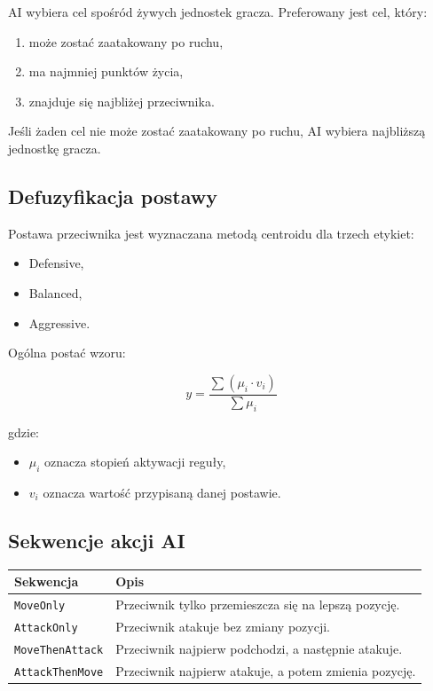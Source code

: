 \documentclass[12pt,a4paper]{article}
\begin{document}
AI wybiera cel spośród żywych jednostek gracza. Preferowany jest cel, który:

\begin{enumerate}
    \item może zostać zaatakowany po ruchu,
    \item ma najmniej punktów życia,
    \item znajduje się najbliżej przeciwnika.
\end{enumerate}

Jeśli żaden cel nie może zostać zaatakowany po ruchu, AI wybiera najbliższą jednostkę gracza.

\subsection{Defuzyfikacja postawy}

Postawa przeciwnika jest wyznaczana metodą centroidu dla trzech etykiet:

\begin{itemize}
    \item Defensive,
    \item Balanced,
    \item Aggressive.
\end{itemize}

Ogólna postać wzoru:

\begin{equation}
    y = \frac{\sum(\mu_i \cdot v_i)}{\sum \mu_i}
\end{equation}

gdzie:

\begin{itemize}
    \item $\mu_i$ oznacza stopień aktywacji reguły,
    \item $v_i$ oznacza wartość przypisaną danej postawie.
\end{itemize}

\subsection{Sekwencje akcji AI}

\begin{longtable}{p{4cm} p{10cm}}
\toprule
\textbf{Sekwencja} & \textbf{Opis} \\
\midrule
\endhead
\texttt{MoveOnly} & Przeciwnik tylko przemieszcza się na lepszą pozycję. \\[4pt]
\texttt{AttackOnly} & Przeciwnik atakuje bez zmiany pozycji. \\[4pt]
\texttt{MoveThenAttack} & Przeciwnik najpierw podchodzi, a następnie atakuje. \\[4pt]
\texttt{AttackThenMove} & Przeciwnik najpierw atakuje, a potem zmienia pozycję. \\
\bottomrule
\end{longtable}
\end{document}
